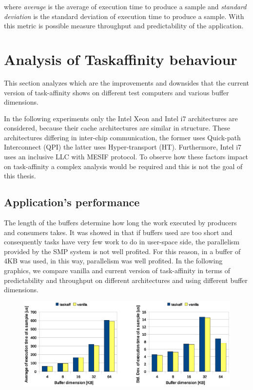 where \textit{average} is the average of execution time to produce a sample and \textit{standard deviation} is the standard deviation of execution 
time to produce a sample. With this metric is possible measure throughput and predictability of the application.

\section{Analysis of Taskaffinity behaviour}

This section analyzes which are the improvements and downsides that the current version of task-affinity shows on different test computers and various
buffer dimensions.

In the following experiments only the Intel Xeon and Intel i7 architectures are considered, because their cache architectures are similar in structure.
These architectures differing in inter-chip communication, the former uses Quick-path Interconnect (QPI) the latter uses Hyper-transport (HT). 
Furthermore, Intel i7 uses an inclusive LLC with MESIF protocol. To observe how these factors impact on task-affinity a complex analysis would be required 
and this is not the goal of this thesis.
 
\subsection{Application's performance}

The length of the buffers determine how long the work executed by producers and consumers takes. It was showed in \cite{lcs} that if buffers used are 
too short and consequently tasks have very few work to do in user-space side, the parallelism provided by the SMP system is not well profited. For 
this reason, in \cite{lcs} a buffer of 4KB was used, in this way, parallelism was well profited. In the following graphics, we compare vanilla and 
current version of task-affinity in terms of predictability and throughput on different architectures and using different buffer dimensions.

\begin{figure}[htbp]
\centering
\includegraphics[width=\widefigure]{images/time/time_avg_var_Xeon.eps}
\caption{}
\label{fig:avg_var_xeon}
\end{figure}

